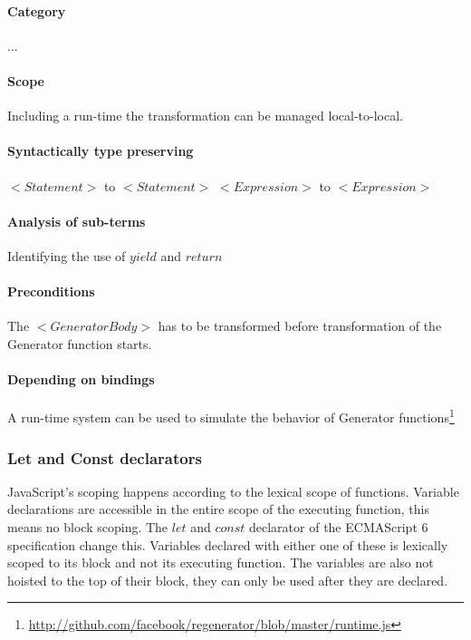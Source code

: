 \documentclass[10pt,a4paper]{article}
\begin{document}
\paragraph{Category}
...

\paragraph{Scope}
Including a run-time the transformation can be managed local-to-local.

\paragraph{Syntactically type preserving}
$<Statement>$ to $<Statement>$
$<Expression>$ to $<Expression>$

\paragraph{Analysis of sub-terms}
Identifying the use of $yield$ and $return$

\paragraph{Preconditions}
The $<GeneratorBody>$ has to be transformed before transformation of the Generator function starts.

\paragraph{Depending on bindings}
A run-time system can be used to simulate the behavior of Generator functions\footnote{\url{http://github.com/facebook/regenerator/blob/master/runtime.js}}

\subsubsection{Let and Const declarators}
JavaScript's scoping happens according to the lexical scope of functions. Variable declarations are accessible in the entire scope of the executing function, this means no block scoping. The $let$ and $const$ declarator of the ECMAScript 6 specification change this. Variables declared with either one of these is lexically scoped to its block and not its executing function. The variables are also not hoisted to the top of their block, they can only be used after they are declared.
\end{document}
